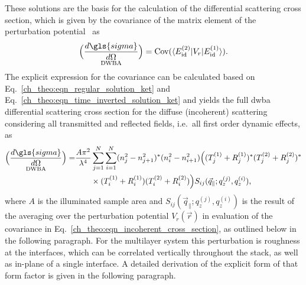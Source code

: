 These solutions are the basis for the calculation of the differential scattering cross section, which is given by the covariance of the matrix element of the perturbation potential~\cite{pietsch_high-resolution_2004} as
\begin{equation}
        \underset{\text{DWBA}}{\Big(\frac{d \gls{sigma}}{d \Omega}\Big)}= \text{Cov}(\langle E_{\text{id}}^{(2)}| V_r|E_{\text{id}}^{(1)}\rangle)\text{.} \label{ch_theo:eqn_incoherent_cross_section} 
\end{equation}
The explicit expression for the covariance can be calculated based on Eq.~\eqref{ch_theo:eqn_regular_solution_ket} and Eq.~\eqref{ch_theo:eqn_time_inverted_solution_ket} and yields the full \gls{dwba} differential scattering cross section for the diffuse (incoherent) scattering considering all transmitted and reflected fields, i.e.~all first order dynamic effects, as
\begin{align}
        {\underset{\text{DWBA}}{\Big(\frac{d \gls{sigma}}{d \Omega}\Big)}} = &\frac{A \pi^2}{\lambda^4}\sum \limits_{j=1}^{N}\sum \limits_{i=1}^{N} (n_j^2 - n_{j+1}^2)^* (n_i^2 - n_{i+1}^2)\Big( (T^{(1)}_j + R^{(1)}_j)^* (T^{(2)}_j + R^{(2)}_j)^* \nonumber \\ &\qquad\times(T^{(1)}_i + R^{(1)}_i) (T^{(2)}_i + R^{(2)}_i) \Big)  S_{ij}(\vec{q}_\parallel; q_z^{(j)}, q_z^{(i)}) \text{,} \label{ch_theo:eqn_full_dwba_expression}
\end{align}
where $A$ is the illuminated sample area and $S_{ij}(\vec{q}_\parallel; q_z^{(j)}, q_z^{(i)})$ is the result of the averaging over the perturbation potential $V_r(\vec{r})$ in evaluation of the covariance in Eq.~\eqref{ch_theo:eqn_incoherent_cross_section}, as outlined below in the following paragraph. For the multilayer system this perturbation is roughness at the interfaces, which can be correlated vertically throughout the stack, as well as in-plane of a single interface. A detailed derivation of the explicit form of that form factor is given in the following paragraph.

